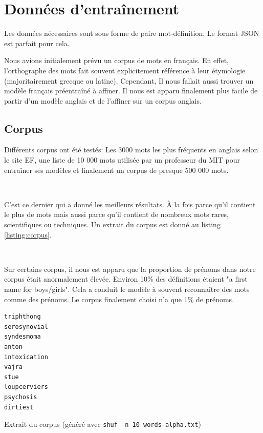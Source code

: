 \documentclass[french]{template}
\begin{document}
\section{Données d'entraînement}

Les données nécessaires sont sous forme de paire mot-définition. Le format JSON est parfait pour cela.

Nous avions initialement prévu un corpus de mots en français. En effet, l'orthographe des mots fait souvent explicitement référence à leur étymologie (majoritairement grecque ou latine). Cependant, Il nous fallait aussi trouver un modèle français préentraîné à affiner. Il nous est apparu finalement plus facile de partir d'un modèle anglais et de l'affiner sur un corpus anglais.

\subsection{Corpus}

Différents corpus ont été testés: Les 3000 mots les plus fréquents en anglais selon le site EF, une liste de 10 000 mots utilisée par un professeur du MIT pour entraîner ses modèles et finalement un corpus de presque 500 000 mots.

\

C'est ce dernier qui a donné les meilleurs résultats. À la fois parce qu'il contient le plus de mots mais aussi parce qu'il contient de nombreux mots rares, scientifiques ou techniques. Un extrait du corpus est donné au listing \ref{listing:corpus}.

\

Sur certains corpus, il nous est apparu que la proportion de prénoms dans notre corpus était anormalement élevée. Environ 10\% des définitions étaient "a first name for boys/girls". Cela a conduit le modèle à souvent reconnaître des mots comme des prénoms. Le corpus finalement choisi n'a que 1\% de prénoms.

\begin{listing}[H]
    \begin{verbatim}
triphthong
serosynovial
syndesmoma
anton
intoxication
vajra
stue
loupcerviers
psychosis
dirtiest
\end{verbatim}
    \caption{Extrait du corpus (généré avec \texttt{shuf -n 10 words-alpha.txt})}
    \label{listing:corpus}
\end{listing}
\end{document}
